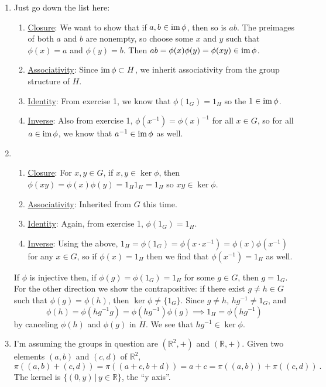 \documentclass[]{article}
\newcommand{\bbr}{\mathbb{R}}
\newcommand{\im}{\text{im\,}}
\begin{document}
\begin{enumerate}
\item Just go down the list here:
\begin{enumerate}
\item \underline{Closure}: We want to show that if $a, b \in \im\phi$, then so is $ab$. The preimages of both $a$ and $b$ are nonempty, so choose some $x$ and $y$ such that $\phi(x) = a$ and $\phi(y) = b$. Then $ab = \phi(x)\phi(y) = \phi(xy) \in \im\phi$.
\item \underline{Associativity}: Since $\im\phi \subset H$, we inherit associativity from the group structure of $H$.
\item \underline{Identity}: From exercise 1, we know that $\phi(1_G) = 1_H$ so the $1 \in \im\phi$.
\item \underline{Inverse}: Also from exercise 1, $\phi(x^{-1}) = \phi(x)^{-1}$ for all $x \in G$, so for all $a \in \im\phi$, we know that $a^{-1} \in \im\phi$ as well.
\end{enumerate}


\item \begin{enumerate}
\item \underline{Closure}: For $x,y \in G$, if $x,y \in \ker \phi$, then $\phi(xy) = \phi(x)\phi(y) = 1_H 1_H = 1_H$ so $xy \in \ker \phi$.
\item \underline{Associativity}: Inherited from $G$ this time.
\item \underline{Identity}: Again, from exercise 1, $\phi(1_G) = 1_H$.
\item \underline{Inverse}: Using the above, $1_H = \phi(1_G) = \phi(x\cdot x^{-1}) = \phi(x)\phi(x^{-1})$ for any $x \in G$, so if $\phi(x) = 1_H$ then we find that $\phi(x^{-1}) = 1_H$ as well.
\end{enumerate}
If $\phi$ is injective then, if $\phi(g) = \phi(1_G) = 1_H$ for some $g\in G$, then $g=1_G$. For the other direction we show the contrapositive: if there exist $g\neq h \in G$ such that $\phi(g) = \phi(h)$, then $\ker\phi \neq \{1_G\}$. Since $g\neq h$, $hg^{-1} \neq 1_G$, and
\begin{equation}
\phi(h) = \phi(hg^{-1}g) = \phi(hg^{-1})\phi(g) \implies 1_H = \phi(hg^{-1})
\end{equation}
by canceling $\phi(h)$ and $\phi(g)$ in $H$. We see that $hg^{-1} \in \ker\phi$.

\item I'm assuming the groups in question are $(\bbr^2, +)$ and $(\bbr, +)$. Given two elements $(a,b)$ and $(c,d)$ of $\bbr^2$,
\begin{equation}
\pi((a,b)+(c,d)) = \pi((a+c,b+d)) = a+c = \pi((a,b)) + \pi((c,d))\ .
\end{equation}
The kernel is $\{(0,y)\,\vert\, y\in\bbr \}$, the ``y axis''.



\end{enumerate}
\end{document}
